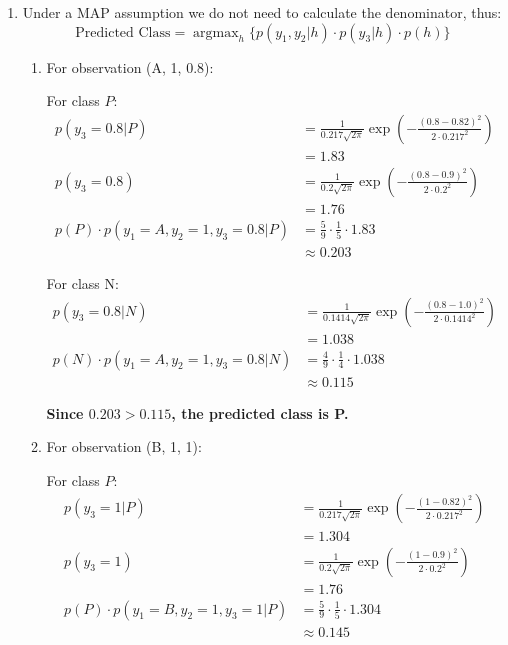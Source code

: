\documentclass{article}
\DeclareMathOperator*{\argmax}{argmax}
\begin{document}
\begin{enumerate}[leftmargin=\labelsep]
\begin{enumerate}
\end{enumerate}

\item Under a MAP assumption we do not need to calculate the
denominator, thus:
\begin{equation*}
  \text{Predicted Class} = \argmax_h \{ p(y_1, y_2 | h) \cdot p(y_3 | h) \cdot p(h) \}
\end{equation*}
\newpage
\begin{enumerate} 
  \item For observation (A, 1, 0.8):


  For class \( P \):
  \begin{align*}
  p(y_3=0.8 | P) &= \frac{1}{0.217 \sqrt{2\pi}} \exp\left(-\frac{(0.8 - 0.82)^2}{2 \cdot 0.217^2}\right) \\[10pt]
  &= 1.83\\
  p(y_3=0.8) &= \frac{1}{0.2 \sqrt{2\pi}} \exp\left(-\frac{(0.8 - 0.9)^2}{2 \cdot 0.2^2}\right) \\[10pt]
  &= 1.76\\
  p(P) \cdot p(y_1 = A, y_2 = 1, y_3=0.8 | P) &= \frac{5}{9} \cdot \frac{1}{5} \cdot 1.83 \\[10pt]
  &\approx 0.203
  \end{align*}

  
  For class N:
  \begin{align*}
  p(y_3=0.8 | N) &= \frac{1}{0.1414 \sqrt{2\pi}} \exp\left(-\frac{(0.8 - 1.0)^2}{2 \cdot 0.1414^2}\right) \\[10pt]
  &= 1.038\\
  p(N) \cdot p(y_1 = A, y_2 = 1, y_3=0.8 | N)   &= \frac{4}{9} \cdot \frac{1}{4} \cdot 1.038 \\[10pt]
  &\approx 0.115
  \end{align*}
  
  \textbf{
  Since $0.203 > 0.115$, the predicted class is P.
  }

  \item For observation (B, 1, 1):
  
  For class \( P \):
  \begin{align*}
  p(y_3=1 | P) &= \frac{1}{0.217 \sqrt{2\pi}} \exp\left(-\frac{(1 - 0.82)^2}{2 \cdot 0.217^2}\right) \\[10pt]
  &=1.304 \\
  p(y_3=1) &= \frac{1}{0.2 \sqrt{2\pi}} \exp\left(-\frac{(1 - 0.9)^2}{2 \cdot 0.2^2}\right) \\[10pt]
  &= 1.76\\
  p(P) \cdot p(y_1 = B, y_2 = 1, y_3=1 | P) &= \frac{5}{9} \cdot \frac{1}{5} \cdot 1.304 \\[10pt]
  &\approx 0.145
  \end{align*}


\end{enumerate}
\end{enumerate}
\end{document}
